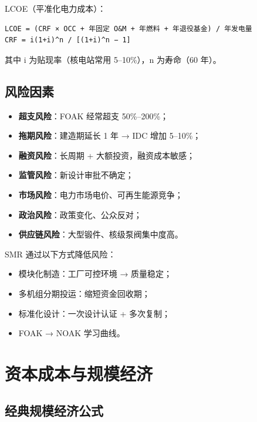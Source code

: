 \documentclass[
  UTF8,
  scheme=plain,
  fontsize=10pt,
  openany
]{ctexbook}
\begin{document}
LCOE（平准化电力成本）：

\begin{verbatim}LCOE = (CRF × OCC + 年固定 O&M + 年燃料 + 年退役基金) / 年发电量
CRF = i(1+i)^n / [(1+i)^n − 1]\end{verbatim}

其中 i 为贴现率（核电站常用 5--10\%），n 为寿命（60 年）。

\subsection{风险因素}\label{ux98ceux9669ux56e0ux7d20}

\begin{itemize}
\tightlist
\item
  \textbf{超支风险}：FOAK 经常超支 50\%--200\%；
\item
  \textbf{拖期风险}：建造期延长 1 年 → IDC 增加 5--10\%；
\item
  \textbf{融资风险}：长周期 + 大额投资，融资成本敏感；
\item
  \textbf{监管风险}：新设计审批不确定；
\item
  \textbf{市场风险}：电力市场电价、可再生能源竞争；
\item
  \textbf{政治风险}：政策变化、公众反对；
\item
  \textbf{供应链风险}：大型锻件、核级泵阀集中度高。
\end{itemize}

SMR 通过以下方式降低风险：

\begin{itemize}
\tightlist
\item
  模块化制造：工厂可控环境 → 质量稳定；
\item
  多机组分期投运：缩短资金回收期；
\item
  标准化设计：一次设计认证 + 多次复制；
\item
  FOAK → NOAK 学习曲线。
\end{itemize}

\section{资本成本与规模经济}\label{ux8d44ux672cux6210ux672cux4e0eux89c4ux6a21ux7ecfux6d4e}

\subsection{经典规模经济公式}\label{ux7ecfux5178ux89c4ux6a21ux7ecfux6d4eux516cux5f0f}
\end{document}
